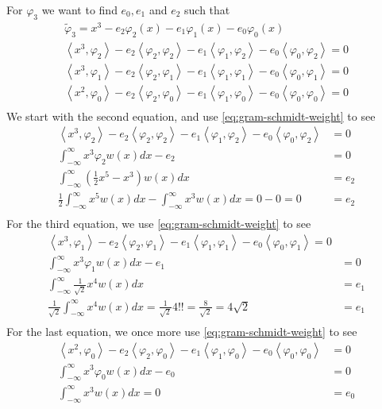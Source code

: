 For $\varphi_3$ we want to find $e_0, e_1$ and $e_2$ such that
\begin{align*}
    \tilde{\varphi}_3 = x^3 - e_2 \varphi_2(x) - e_1 \varphi_1(x) - e_0 \varphi_0(x) \\
    \left<x^3, \varphi_2 \right> - e_2 \left< \varphi_2, \varphi_2 \right> - e_1 \left< \varphi_1, \varphi_2 \right> - e_0 \left< \varphi_0, \varphi_2 \right> = 0 \\
    \left<x^3, \varphi_1 \right> - e_2 \left< \varphi_2, \varphi_1 \right> - e_1 \left< \varphi_1, \varphi_1 \right> - e_0 \left< \varphi_0, \varphi_1 \right> = 0 \\
    \left<x^2, \varphi_0 \right> - e_2 \left< \varphi_2, \varphi_0 \right> - e_1 \left< \varphi_1, \varphi_0 \right> - e_0 \left< \varphi_0, \varphi_0 \right> = 0 \\
\end{align*}
We start with the second equation, and use \eqref{eq:gram-schmidt-weight} to see
\begin{align*}
    \left<x^3, \varphi_2 \right> - e_2 \left< \varphi_2, \varphi_2 \right> - e_1 \left< \varphi_1, \varphi_2 \right> - e_0 \left< \varphi_0, \varphi_2 \right> &= 0 \\
    \int_{-\infty}^\infty x^3 \varphi_2 w(x) dx - e_2 &= 0 \\
    \int_{-\infty}^\infty \left( \frac{1}{2} x^5 - x^3 \right) w(x) dx &= e_2 \\
    \frac{1}{2} \int_{-\infty}^\infty x^5 w(x) dx - \int_{-\infty}^\infty x^3 w(x) dx = 0 - 0 = 0 &= e_2 \\
\end{align*}
For the third equation, we use \eqref{eq:gram-schmidt-weight} to see
\begin{align*}
    \left<x^3, \varphi_1 \right> - e_2 \left< \varphi_2, \varphi_1 \right> - e_1 \left< \varphi_1, \varphi_1 \right> - e_0 \left< \varphi_0, \varphi_1 \right> = 0 \\
    \int_{-\infty}^\infty x^3 \varphi_1 w(x) dx - e_1 &= 0 \\
    \int_{-\infty}^\infty \frac{1}{\sqrt{2}} x^4 w(x) dx &= e_1 \\
    \frac{1}{\sqrt{2}} \int_{-\infty}^\infty x^4 w(x) dx = \frac{1}{\sqrt{2}} 4!! = \frac{8}{\sqrt{2}} = 4\sqrt{2} &= e_1 \\
\end{align*}
For the last equation, we once more use \eqref{eq:gram-schmidt-weight} to see
\begin{align*}
    \left<x^2, \varphi_0 \right> - e_2 \left< \varphi_2, \varphi_0 \right> - e_1 \left< \varphi_1, \varphi_0 \right> - e_0 \left< \varphi_0, \varphi_0 \right> &= 0 \\
    \int_{-\infty}^\infty x^3 \varphi_0 w(x) dx - e_0 &= 0 \\
    \int_{-\infty}^\infty x^3 w(x) dx = 0 &= e_0 \\
\end{align*}
